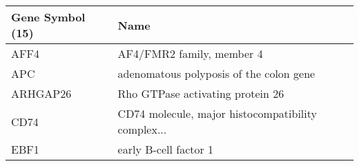\begin{tabular}{ll}
\toprule
Gene Symbol (15) &                                               Name \\
\midrule
            AFF4 &                          AF4/FMR2 family, member 4 \\
             APC &            adenomatous polyposis of the colon gene \\
        ARHGAP26 &                   Rho GTPase activating protein 26 \\
            CD74 & CD74 molecule, major histocompatibility complex... \\
            EBF1 &                              early B-cell factor 1 \\
\bottomrule
\end{tabular}
